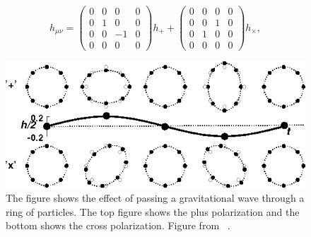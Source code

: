 \documentclass{ttuthes2007}
\begin{document}
\begin{equation*}                                                               
h_{\mu\nu}=     
 \begin{pmatrix}                                                                
    0 & 0 & 0 & 0 \\                                                            
    0 & 1 & 0 & 0 \\                                                            
    0 & 0 & -1 & 0 \\                                                            
    0 & 0 & 0 & 0                                                               
 \end{pmatrix}
h_+  
+
 \begin{pmatrix}                                                                
    0 & 0 & 0 & 0 \\                                                            
    0 & 0 & 1 & 0 \\                                                            
    0 & 1 & 0 & 0 \\                                                            
    0 & 0 & 0 & 0                                                               
 \end{pmatrix}
h_\times,                                                                  
\end{equation*} 

\begin{figure}[h!]                                                              
	\includegraphics[width=\textwidth]{figure/polarization.png}
	\caption{The figure shows the effect of passing a gravitational wave
through a ring of particles. The top figure shows the plus polarization and the
bottom shows the cross polarization. Figure from ~\cite{Schutz}.}                                                     
        \label{fig:polarization}
\end{figure}
\end{document}
